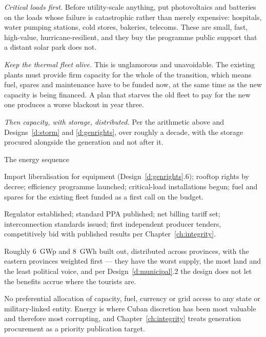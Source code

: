 \emph{Critical loads first.} Before utility-scale anything, put photovoltaics
and batteries on the loads whose failure is catastrophic rather than merely
expensive: hospitals, water pumping stations, cold stores, bakeries, telecoms.
These are small, fast, high-value, hurricane-resilient, and they buy the
programme public support that a distant solar park does not.

\emph{Keep the thermal fleet alive.} This is unglamorous and unavoidable. The
existing plants must provide firm capacity for the whole of the transition, which
means fuel, spares and maintenance have to be funded now, at the same time as
the new capacity is being financed. A plan that starves the old fleet to pay for
the new one produces a worse blackout in year three.

\emph{Then capacity, with storage, distributed.} Per the arithmetic above and
Designs~\ref{d:storm} and \ref{d:genrights}, over roughly a decade, with the
storage procured alongside the generation and not after it.

\begin{design}{The energy sequence}
\label{d:energyseq}
\begin{rules}
 Import liberalisation for equipment (Design~\ref{d:genrights}.6);
rooftop rights by decree; efficiency programme launched; critical-load
installations begun; fuel and spares for the existing fleet funded as a first
call on the budget.

 Regulator established; standard PPA published; net billing
tariff set; interconnection standards issued; first independent producer
tenders, competitively bid with published results per
Chapter~\ref{ch:integrity}.

 Roughly 6~GWp and 8~GWh built out, distributed across
provinces, with the eastern provinces weighted first --- they have the worst
supply, the most land and the least political voice, and per
Design~\ref{d:municipal}.2 the design does not let the benefits accrue where the
tourists are.

 No preferential allocation of capacity, fuel, currency or
grid access to any state or military-linked entity. Energy is where Cuban
discretion has been most valuable and therefore most corrupting, and
Chapter~\ref{ch:integrity} treats generation procurement as a priority
publication target.
\end{rules}
\end{design}

